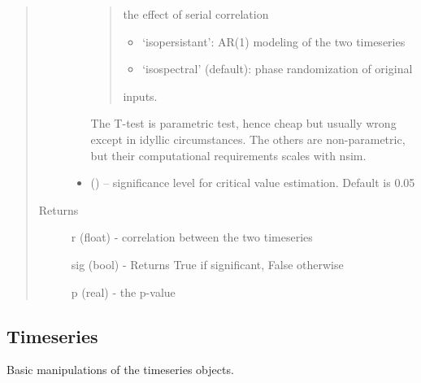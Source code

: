 \documentclass[letterpaper,10pt,english]{sphinxmanual}
\begin{document}
\begin{fulllineitems}
\begin{quote}
\begin{description}
\begin{itemize}
\begin{quote}
\begin{itemize}
\end{itemize}

the effect of serial correlation
\begin{itemize}
\item {} 
`isopersistant': AR(1) modeling of the two timeseries

\item {} 
`isospectral' (default): phase randomization of original

\end{itemize}

inputs.
\end{quote}

The T-test is parametric test, hence cheap but usually wrong
except in idyllic circumstances.
The others are non-parametric, but their computational
requirements scales with nsim.


\item {} 
 () -- significance level for critical value estimation. Default is 0.05

\end{itemize}

\item[{Returns}] \leavevmode

r (float) - correlation between the two timeseries

sig (bool) -  Returns True if significant, False otherwise

p (real) - the p-value


\end{description}\end{quote}

\end{fulllineitems}



\subsection{Timeseries}
\label{\detokenize{Main:timeseries}}
Basic manipulations of the timeseries objects.
\end{document}
